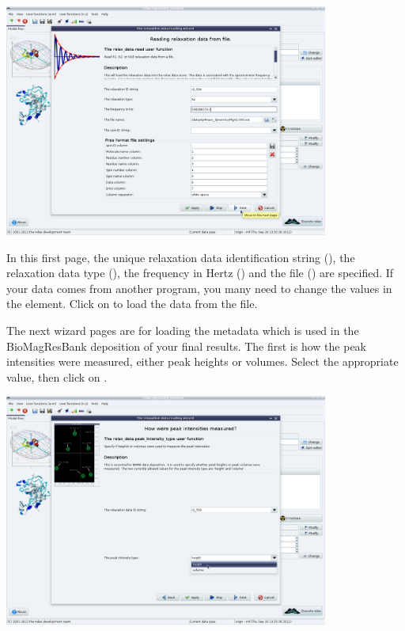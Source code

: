 \begin{htmlonly}
\begin{htmlonly}
\begin{minipage}[h]{\linewidth}
\centerline{\includegraphics[width=0.8\textwidth, bb=14 14 1415 1019]{graphics/screenshots/mf_analysis/relax_data_file}}
\end{minipage}

In this first page, the unique relaxation data identification string (), the relaxation data type (), the frequency in Hertz () and the file () are specified.  If your data comes from another program, you many need to change the values in the  element.  Click on  to load the data from the file.

The next wizard pages are for loading the metadata which is used in the BioMagResBank deposition of your final results.  The first is how the peak intensities were measured, either peak heights or volumes.  Select the appropriate value, then click on .

\begin{minipage}[h]{\linewidth}
\centerline{\includegraphics[width=0.8\textwidth, bb=14 14 1415 1019]{graphics/screenshots/mf_analysis/relax_data_intensity}}
\end{minipage}


\end{htmlonly}
\end{htmlonly}
